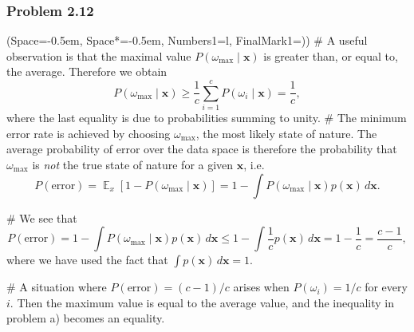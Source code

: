 \documentclass[12pt, a4paper]{article}
\newcommand{\listSpace}{-0.5em}%
\newcommand{\vect}[1]{\bm{#1}}
\DeclareMathOperator{\E}{\mathbb{E}}
\begin{document}
\subsubsection*{Problem 2.12}
\begin{easylist}[enumerate]
\ListProperties(Space=\listSpace, Space*=\listSpace, Numbers1=l, FinalMark1={)})
# A useful observation is that the maximal value $P(\omega_{\text{max}}  \mid  \vect{x} )$ is greater than, or equal to, the average. Therefore we obtain
\begin{equation*}
	P(\omega_{\text{max}}  \mid  \vect{x} ) \geq \frac{1}{c} \sum_{i=1}^{c} P(\omega_i  \mid  \vect{x}) = \frac{1}{c},
\end{equation*}
where the last equality is due to probabilities summing to unity.
# The minimum error rate is achieved by choosing $\omega_{\text{max}}$, the most likely state of nature. 
The average probability of error over the data space is therefore the probability that $\omega_{\text{max}}$ is \emph{not} the true state of nature for a given $\vect{x}$, i.e.
\begin{equation*}
	P(\text{error}) = \E_x \left[ 1 - P(\omega_{\text{max}}  \mid  \vect{x} ) \right] = 1 - \int P(\omega_{\text{max}}  \mid  \vect{x} ) p(\vect{x}) \, d \vect{x}.
\end{equation*}

# We see that
\begin{equation*}
	P(\text{error}) = 1 - \int P(\omega_{\text{max}}  \mid  \vect{x} ) p(\vect{x}) \, d \vect{x} \leq 1 - \int \frac{1}{c} p(\vect{x}) \, d \vect{x} = 1 - \frac{1}{c} = \frac{c-1}{c},
\end{equation*}
where we have used the fact that $\int p(\vect{x}) \, d \vect{x} = 1$.


# A situation where $P(\text{error}) = (c-1)/c$ arises when $P(\omega_i) = 1/c$ for every $i$. Then the maximum value is equal to the average value, and the inequality in problem a) becomes an equality.
\end{easylist}
\end{document}
